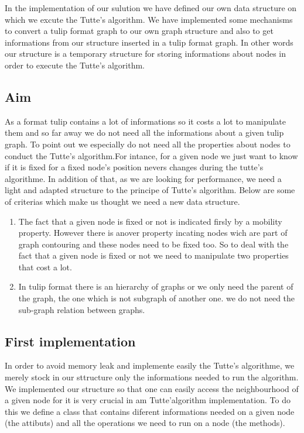 In the implementation of our sulution we have defined our own data
structure on which we excute the Tutte's algorithm. We have
implemented some mechanisms to convert a tulip format graph to our own
graph structure and also to get informations from our structure
inserted in a tulip format graph. In other words our structure is a
temporary structure for storing informations about nodes in order to
execute the Tutte's algorithm.

\subsection{Aim}
As a format tulip contains a lot of informations so it costs a lot to
manipulate them and so far away we do not need all the informations
about a given tulip graph. To point out we especially do not need all
the properties about nodes to conduct the Tutte's algorithm.For
intance, for a given node we just want to know if it is fixed for a
fixed node's position nevers changes during the tutte's algorithme. In
addition of that, as we are looking for performance, we need a light
and adapted structure to the principe of Tutte's algorithm. Below are
some of criterias which make us thought we need a new data structure.
\begin{enumerate}
\item The fact that a given node is fixed or not is indicated firsly
  by a mobility property. However there is anover property incating
  nodes wich are part of graph contouring and these nodes need to be
  fixed too. So to deal with the fact that a given node is fixed or
  not we need to manipulate two properties that cost a lot.

\item In tulip format there is an hierarchy of graphs or we only need
  the parent of the graph, the one which is not subgraph of another
  one. we do not need the sub-graph relation between graphs.


\end{enumerate}  

\subsection{First implementation}
In order to avoid memory leak and implemente easily the Tutte's
algorithme, we merely stock in our sttructure only the informations
needed to run the algorithm. We implemented our structure so that one
can easily access the neighbourhood of a given node for it is very
crucial in am Tutte'algorithm implementation. To do this we define a
class that contains diferent informations needed on a given node (the
attibuts) and all the operations we need to run on a node (the
methods).

